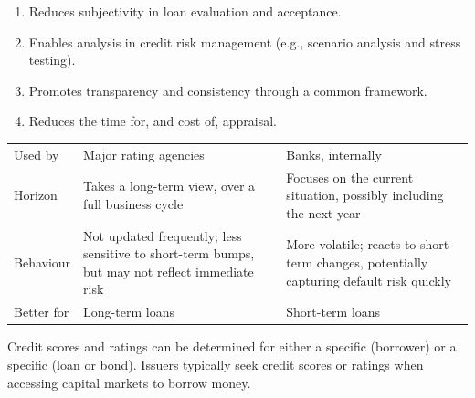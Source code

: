 \begin{crkeybox}
\begin{enumerate}
\item Reduces subjectivity in loan evaluation and acceptance.
\item Enables analysis in credit risk management (e.g., scenario analysis and
stress testing).
\item Promotes transparency and consistency through a common framework.
\item Reduces the time for, and cost of, appraisal.
\end{enumerate}
\end{crkeybox}


\begin{center}
\footnotesize
\begin{tabular}{L{2.6cm} L{5.8cm} L{6.2cm}}
\toprule
 &  &  \\
\midrule
Used by & Major rating agencies & Banks, internally \\
Horizon & Takes a long-term view, over a full business cycle &
  Focuses on the current situation, possibly including the next year \\
Behaviour & Not updated frequently; less sensitive to short-term bumps, but may
  not reflect immediate risk &
  More volatile; reacts to short-term changes, potentially capturing default risk
  quickly \\
Better for & Long-term loans & Short-term loans \\
\bottomrule
\end{tabular}
\end{center}


Credit scores and ratings can be determined for either a specific 
(borrower) or a specific  (loan or bond). Issuers typically seek
credit scores or ratings when accessing capital markets to borrow money.

